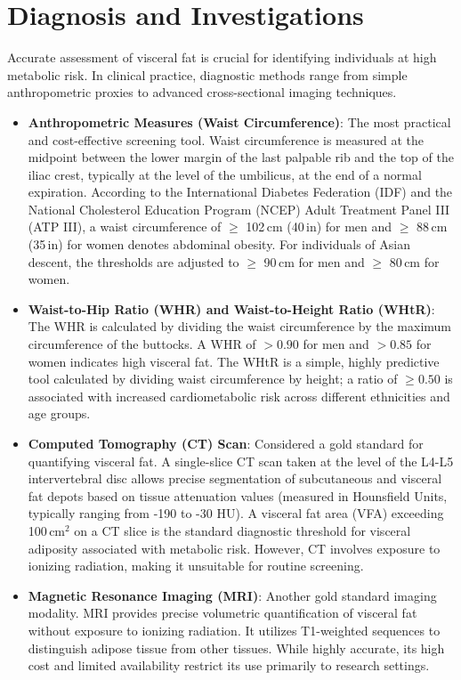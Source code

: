 \section*{Diagnosis and Investigations}
Accurate assessment of visceral fat is crucial for identifying individuals at high metabolic risk. In clinical practice, diagnostic methods range from simple anthropometric proxies to advanced cross-sectional imaging techniques.

\begin{itemize}
    \item \textbf{Anthropometric Measures (Waist Circumference)}: The most practical and cost-effective screening tool. Waist circumference is measured at the midpoint between the lower margin of the last palpable rib and the top of the iliac crest, typically at the level of the umbilicus, at the end of a normal expiration. According to the International Diabetes Federation (IDF) and the National Cholesterol Education Program (NCEP) Adult Treatment Panel III (ATP III), a waist circumference of $\ge$ 102\,cm (40\,in) for men and $\ge$ 88\,cm (35\,in) for women denotes abdominal obesity. For individuals of Asian descent, the thresholds are adjusted to $\ge$ 90\,cm for men and $\ge$ 80\,cm for women.
    \item \textbf{Waist-to-Hip Ratio (WHR) and Waist-to-Height Ratio (WHtR)}: The WHR is calculated by dividing the waist circumference by the maximum circumference of the buttocks. A WHR of $> 0.90$ for men and $> 0.85$ for women indicates high visceral fat. The WHtR is a simple, highly predictive tool calculated by dividing waist circumference by height; a ratio of $\ge 0.50$ is associated with increased cardiometabolic risk across different ethnicities and age groups.
    \item \textbf{Computed Tomography (CT) Scan}: Considered a gold standard for quantifying visceral fat. A single-slice CT scan taken at the level of the L4-L5 intervertebral disc allows precise segmentation of subcutaneous and visceral fat depots based on tissue attenuation values (measured in Hounsfield Units, typically ranging from -190 to -30 HU). A visceral fat area (VFA) exceeding 100\,cm$^2$ on a CT slice is the standard diagnostic threshold for visceral adiposity associated with metabolic risk. However, CT involves exposure to ionizing radiation, making it unsuitable for routine screening.
    \item \textbf{Magnetic Resonance Imaging (MRI)}: Another gold standard imaging modality. MRI provides precise volumetric quantification of visceral fat without exposure to ionizing radiation. It utilizes T1-weighted sequences to distinguish adipose tissue from other tissues. While highly accurate, its high cost and limited availability restrict its use primarily to research settings.

\end{itemize}
